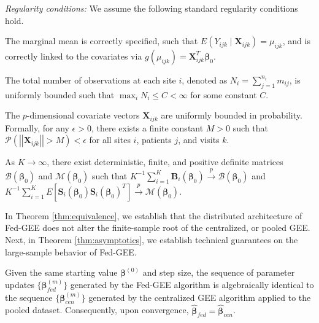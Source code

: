 \documentclass[useAMS,referee, usegraphicx]{biom}
\begin{document}
\emph{Regularity conditions:} We assume the following standard regularity conditions hold.
\begin{assumption}\label{ass:1}
The marginal mean is correctly specified, such that $E(Y_{ijk} \mid \mathbf{X}_{ijk}) = \mu_{ijk}$, and is correctly linked to the covariates via $g(\mu_{ijk}) = \mathbf{X}_{ijk}^T \boldsymbol{\beta}_0$.
\end{assumption}
\begin{assumption}\label{ass:2}
The total number of observations at each site $i$, denoted as $N_i = \sum_{j=1}^{n_i} m_{ij}$, is uniformly bounded such that $\max_i N_i \le C < \infty$ for some constant $C$.
\end{assumption}
\begin{assumption}\label{ass:3}
The $p$-dimensional covariate vectors $\mathbf{X}_{ijk}$ are uniformly bounded in probability. Formally, for any $\epsilon > 0$, there exists a finite constant $M > 0$ such that $\mathcal{P}\left(\left| \left|\mathbf{X}_{ijk}\right| \right| > M\right) < \epsilon$ for all sites $i$, patients $j$, and visits $k$.
\end{assumption}
\begin{assumption}\label{ass:4}
As $K \to \infty$, there exist deterministic, finite, and positive definite matrices $\mathcal{B}(\boldsymbol{\beta}_0)$ and $\mathcal{M}(\boldsymbol{\beta}_0)$ such that $K^{-1} \sum_{i=1}^K \mathbf{B}_i(\boldsymbol{\beta}_0) \xrightarrow{p} \mathcal{B}(\boldsymbol{\beta}_0)$ and $K^{-1} \sum_{i=1}^K E\left[\mathbf{S}_i(\boldsymbol{\beta}_0) \mathbf{S}_i(\boldsymbol{\beta}_0)^T \right] \xrightarrow{p} \mathcal{M}(\boldsymbol{\beta}_0)$.
\end{assumption}

In Theorem \ref{thm:equivalence}, we establish that the distributed architecture of Fed-GEE does not alter the finite-sample root of the centralized, or pooled GEE. Next, in Theorem \ref{thm:asymptotics}, we establish technical guarantees on the large-sample behavior of Fed-GEE.

\begin{theorem}
\label{thm:equivalence}
Given the same starting value $\boldsymbol{\beta}^{(0)}$ and step size, the sequence of parameter updates $\{\boldsymbol{\beta}^{(m)}_{fed}\}$ generated by the Fed-GEE algorithm is algebraically identical to the sequence $\{\boldsymbol{\beta}^{(m)}_{cen}\}$ generated by the centralized GEE algorithm applied to the pooled dataset. Consequently, upon convergence, $\hat{\boldsymbol{\beta}}_{fed} = \hat{\boldsymbol{\beta}}_{cen}$.
\end{theorem}
\end{document}

